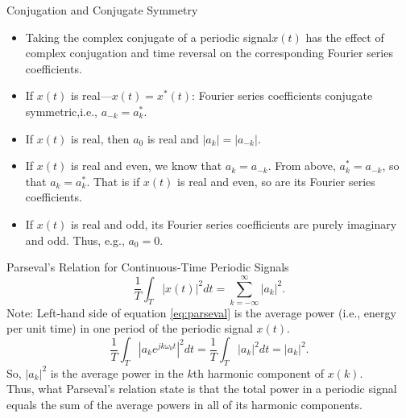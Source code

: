 \begin{frame}{Conjugation and Conjugate Symmetry}
    {
        
        \begin{itemize}[<+->]
          \item Taking the complex conjugate of a periodic signal$x(t)$ has the effect of complex conjugation and \alert{time reversal} on the corresponding Fourier series coefficients. 
          \item If $x(t)$ is real---$x(t) = x^\ast(t)$: Fourier series coefficients conjugate symmetric,i.e., $a_{-k} = a^\ast_k$.
          \item If $x(t)$ is real, then $a_0$ is real and $|a_k| = |a_{-k}|$.
          \item If $x(t)$ is real and even, we know that $a_k = a_{-k}$. From above, $a^\ast_k = a_{-k}$, so that $a_{k} = a^\ast_k$. That is if $x(t)$ is real and even, so are its Fourier series coefficients.
          \item If $x(t)$ is real and odd, its Fourier series coefficients are purely imaginary and odd. Thus, e.g., $a_0 = 0$.%
        \end{itemize}
    }
\end{frame}


\begin{frame}{Parseval's Relation for Continuous-Time Periodic Signals}
    \begin{equation}\label{eq:parseval}
        \frac{1}{T}\int_{T} |x(t)|^2dt = \sum_{k=-\infty}^{\infty}|a_k|^2.
    \end{equation}
    {
        Note: Left-hand side of equation \ref{eq:parseval} is the average power (i.e., energy per unit time) in one period of the periodic signal $x(t)$.\\

        \begin{equation}
            \frac{1}{T}\int_{T} \left| a_k e^{jk\omega_0 t}\right|^2dt = \frac{1}{T}\int_{T} \left| a_k \right|^2dt = |a_k|^2.
        \end{equation}
        So, $|a_k|^2$ is the average power in the $k$th harmonic component of $x(k)$.\\
        Thus, what Parseval's relation state is that the total power in a periodic signal equals the sum of the average powers in all of its harmonic components.
    }
\end{frame}

